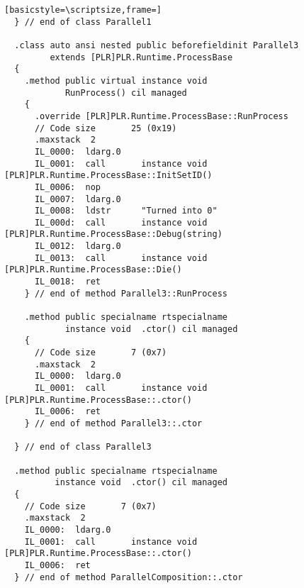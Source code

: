 \begin{lstlisting}[basicstyle=\scriptsize,frame=]
  } // end of class Parallel1

  .class auto ansi nested public beforefieldinit Parallel3
         extends [PLR]PLR.Runtime.ProcessBase
  {
    .method public virtual instance void 
            RunProcess() cil managed
    {
      .override [PLR]PLR.Runtime.ProcessBase::RunProcess
      // Code size       25 (0x19)
      .maxstack  2
      IL_0000:  ldarg.0
      IL_0001:  call       instance void [PLR]PLR.Runtime.ProcessBase::InitSetID()
      IL_0006:  nop
      IL_0007:  ldarg.0
      IL_0008:  ldstr      "Turned into 0"
      IL_000d:  call       instance void [PLR]PLR.Runtime.ProcessBase::Debug(string)
      IL_0012:  ldarg.0
      IL_0013:  call       instance void [PLR]PLR.Runtime.ProcessBase::Die()
      IL_0018:  ret
    } // end of method Parallel3::RunProcess

    .method public specialname rtspecialname 
            instance void  .ctor() cil managed
    {
      // Code size       7 (0x7)
      .maxstack  2
      IL_0000:  ldarg.0
      IL_0001:  call       instance void [PLR]PLR.Runtime.ProcessBase::.ctor()
      IL_0006:  ret
    } // end of method Parallel3::.ctor

  } // end of class Parallel3

  .method public specialname rtspecialname 
          instance void  .ctor() cil managed
  {
    // Code size       7 (0x7)
    .maxstack  2
    IL_0000:  ldarg.0
    IL_0001:  call       instance void [PLR]PLR.Runtime.ProcessBase::.ctor()
    IL_0006:  ret
  } // end of method ParallelComposition::.ctor


\end{lstlisting}
